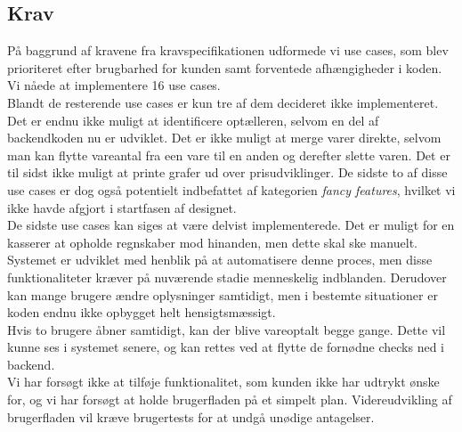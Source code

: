 \documentclass[]{article}
\begin{document}
\subsection{Krav}
På baggrund af kravene fra kravspecifikationen udformede vi use cases, som blev prioriteret efter brugbarhed for kunden samt forventede afhængigheder i koden. Vi nåede at implementere 16 use cases. \\
Blandt de resterende use cases er kun tre af dem decideret ikke implementeret. Det er endnu ikke muligt at identificere optælleren, selvom en del af backendkoden nu er udviklet. Det er ikke muligt at merge varer direkte, selvom man kan flytte vareantal fra een vare til en anden og derefter slette varen. Det er til sidst ikke muligt at printe grafer ud over prisudviklinger. De sidste to af disse use cases er dog også potentielt indbefattet af kategorien \textit{fancy features}, hvilket vi ikke havde afgjort i startfasen af designet. \\ 
De sidste use cases kan siges at være delvist implementerede. Det er muligt for en kasserer at opholde regnskaber mod hinanden, men dette skal ske manuelt. Systemet er udviklet med henblik på at automatisere denne proces, men disse funktionaliteter kræver på nuværende stadie menneskelig indblanden. Derudover kan mange brugere ændre oplysninger samtidigt, men i bestemte situationer er koden endnu ikke opbygget helt hensigtsmæssigt. \\
Hvis to brugere åbner samtidigt, kan der blive vareoptalt begge gange. Dette vil kunne ses i systemet senere, og kan rettes ved at flytte de fornødne checks ned i backend. \\
Vi har forsøgt ikke at tilføje funktionalitet, som kunden ikke har udtrykt ønske for, og vi har forsøgt at holde brugerfladen på et simpelt plan. Videreudvikling af brugerfladen vil kræve brugertests for at undgå unødige antagelser. 
\end{document}
